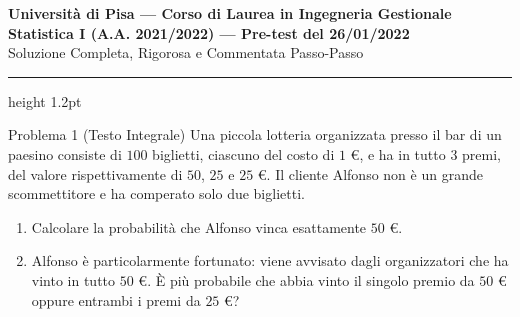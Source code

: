 \documentclass[11pt,a4paper]{article}
\begin{document}
\begin{center}
    {\LARGE\bfseries\color{navyblue} Università di Pisa --- Corso di Laurea in Ingegneria Gestionale}\\[0.4em]
    {\Large\bfseries Statistica I (A.A. 2021/2022) --- Pre-test del 26/01/2022}\\[0.3em]
    {\large\textsf{Soluzione Completa, Rigorosa e Commentata Passo-Passo}}
\end{center}
\vspace{0.5em}
\hrule height 1.2pt
\vspace{1.5em}

\begin{problemabox}{Problema 1 (Testo Integrale)}
Una piccola lotteria organizzata presso il bar di un paesino consiste di $100$ biglietti, ciascuno del costo di $1\text{ €}$, e ha in tutto $3$ premi, del valore rispettivamente di $50$, $25$ e $25\text{ €}$. Il cliente Alfonso non è un grande scommettitore e ha comperato solo due biglietti.
\begin{enumerate}
    \item Calcolare la probabilità che Alfonso vinca esattamente $50\text{ €}$.
    \item Alfonso è particolarmente fortunato: viene avvisato dagli organizzatori che ha vinto in tutto $50\text{ €}$. È più probabile che abbia vinto il singolo premio da $50\text{ €}$ oppure entrambi i premi da $25\text{ €}$?
\end{enumerate}
\end{problemabox}
\end{document}
